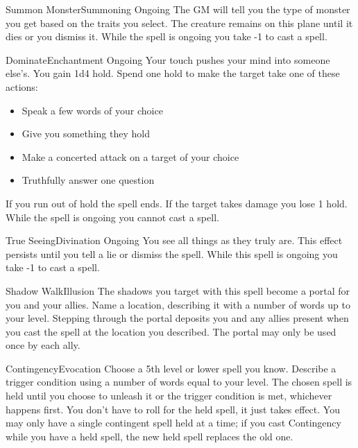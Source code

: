 \documentclass[8pt]{extarticle}
\begin{document}
\begin{multicols}{2}
\begin{aspell}{Summon Monster}{Summoning Ongoing}
    The GM will tell you the type of monster you get based on the
    traits you select.  The creature remains on this plane until it
    dies or you dismiss it. While the spell is ongoing you take -1 to
    cast a spell.
  \end{aspell}


\vfill\null
\end{multicols}

\begin{multicols}{2}

  \begin{aspell}{Dominate}{Enchantment Ongoing}
    Your touch pushes your mind into someone else’s. You gain 1d4
    hold. Spend one hold to make the target take one of these actions:
    \begin{itemize}
    \item Speak a few words of your choice
    \item Give you something they hold
    \item Make a concerted attack on a target of your choice
    \item Truthfully answer one question
    \end{itemize}

    If you run out of hold the spell ends. If the target takes damage
    you lose 1 hold.  While the spell is ongoing you cannot cast a
    spell.
  \end{aspell}

  \begin{aspell}{True Seeing}{Divination Ongoing}
    You see all things as they truly are. This effect persists until
    you tell a lie or dismiss the spell. While this spell is ongoing
    you take -1 to cast a spell.
  \end{aspell}


  \begin{aspell}{Shadow Walk}{Illusion}
    The shadows you target with this spell become a portal for you and
    your allies.  Name a location, describing it with a number of
    words up to your level. Stepping through the portal deposits you
    and any allies present when you cast the spell at the location you
    described. The portal may only be used once by each ally.
  \end{aspell}

  \vfill\null
  \columnbreak

  \begin{aspell}{Contingency}{Evocation}
    Choose a 5th level or lower spell you know. Describe a trigger
    condition using a number of words equal to your level. The chosen
    spell is held until you choose to unleash it or the trigger
    condition is met, whichever happens first. You don’t have to roll
    for the held spell, it just takes effect. You may only have a
    single contingent spell held at a time; if you cast Contingency
    while you have a held spell, the new held spell replaces the old
    one.
  \end{aspell}


\end{multicols}
\end{document}
